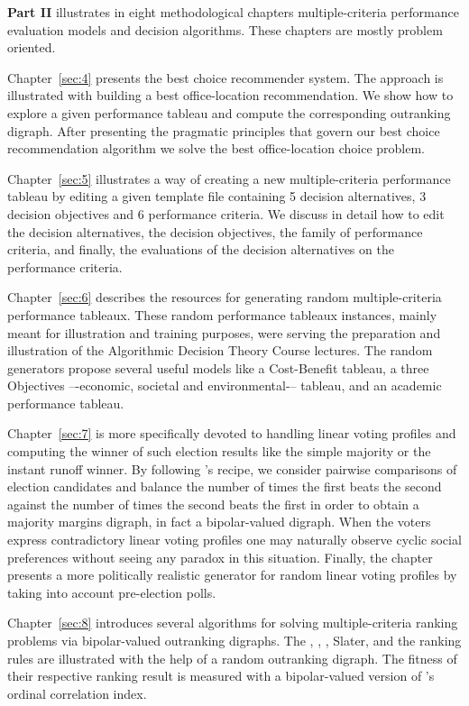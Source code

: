 \textbf{Part II} illustrates in eight methodological chapters multiple-criteria performance evaluation models and decision algorithms. These chapters are mostly problem oriented.

Chapter~\ref{sec:4} presents the \Rubis best choice recommender system. The approach is illustrated with building a best office-location recommendation. We show how to explore a given performance tableau and compute the corresponding outranking digraph. After presenting the pragmatic principles that govern our best choice recommendation algorithm we solve the best office-location choice problem.

Chapter~\ref{sec:5} illustrates a way of creating a new multiple-criteria performance tableau by editing a given template file containing 5 decision alternatives, 3 decision objectives and 6 performance criteria. We discuss in detail how to edit the decision alternatives, the decision objectives, the family of performance criteria, and finally, the evaluations of the decision alternatives on the performance criteria.

Chapter~\ref{sec:6} describes the \Digraph resources for generating random multiple-criteria performance tableaux. These random performance tableaux instances, mainly meant for illustration and training purposes, were serving the preparation and illustration of the Algorithmic Decision Theory Course lectures. The random generators propose several useful models like a Cost-Benefit tableau, a three Objectives –-economic, societal and environmental-– tableau, and an academic performance tableau.

Chapter~\ref{sec:7} is more specifically devoted to handling linear voting profiles and computing the winner of such election results like the simple majority or the instant runoff winner. By following \Condorcet 's recipe, we consider pairwise comparisons of election candidates and balance the number of times the first beats the second against the number of times the second beats the first in order to obtain a majority margins digraph, in fact a bipolar-valued digraph. When the voters express contradictory linear voting profiles one may naturally observe cyclic social preferences without seeing any paradox in this situation. Finally, the chapter presents a more politically realistic generator for random linear voting profiles by taking into account pre-election polls.

Chapter~\ref{sec:8} introduces several algorithms for solving multiple-criteria ranking problems via bipolar-valued outranking digraphs. The \Copeland, \NetFlows, \Kemeny, {\sc Sla\-ter}, \Kohler and the \RankedPairs ranking rules are illustrated with the help of a random outranking digraph. The fitness of their respective ranking result is measured with a bipolar-valued version of \Kendall 's ordinal correlation index.

